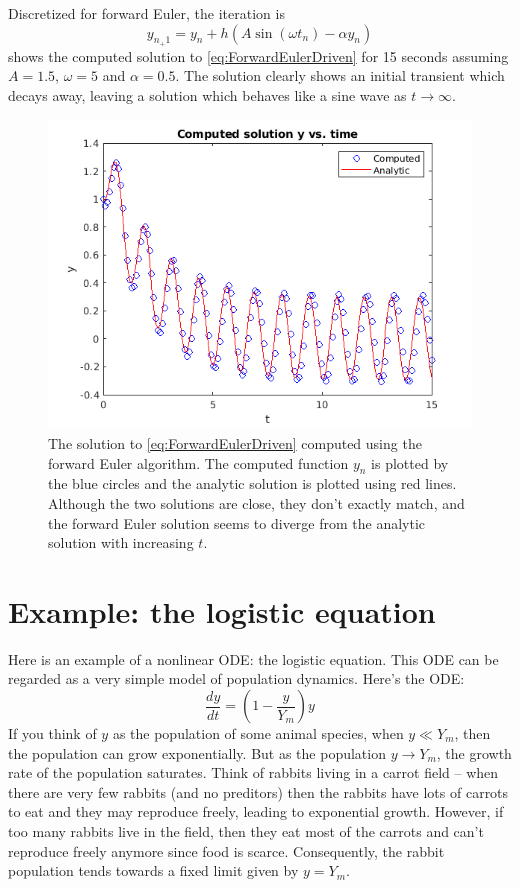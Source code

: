 \documentclass[hidelinks,notitlepage]{book}
\begin{document}
Discretized for forward Euler, the iteration is
\begin{equation}
y_{n_+1} = y_n + h(A \sin(\omega t_n) - \alpha y_n)
\end{equation}
 shows the computed solution to \cref{eq:ForwardEulerDriven} for 15 seconds assuming $A = 1.5$, $\omega = 5$ and $\alpha = 0.5$.  The solution clearly shows an initial transient which decays away, leaving a solution which behaves like a sine wave as $t \rightarrow \infty$.
\begin{figure}[tbh]
	\centering
	\includegraphics[width=0.7\columnwidth]{ForwardEulerDriven.png}
	\caption{The solution to \cref{eq:ForwardEulerDriven} computed using the forward Euler algorithm.  The computed function $y_n$ is plotted by the blue circles and the analytic solution is plotted using red lines.  Although the two solutions are close, they don't exactly match, and the forward Euler solution seems to diverge from the analytic solution with increasing $t$.}
	\label{fig:ForwardEulerDriven1}
\end{figure}

\section{Example: the logistic equation}
Here is an example of a nonlinear ODE: the logistic equation.  This ODE can be regarded as a very simple model of population dynamics.  Here's the ODE:
\begin{equation}
\label{eq:ForwardEulerLogistic}
\frac{d y}{d t} = \left( 1 - \frac{y}{Y_m} \right) y
\end{equation}
If you think of $y$ as the population of some animal species, when $y \ll Y_m$, then the population can grow exponentially.  But as the population $y \rightarrow Y_m$, the growth rate of the population saturates.  Think of rabbits living in a carrot field -- when there are very few rabbits (and no preditors) then the rabbits have lots of carrots to eat and they may reproduce freely, leading to exponential growth.  However, if too many rabbits live in the field, then they eat most of the carrots and can't reproduce freely anymore since food is scarce.  Consequently, the rabbit population tends towards a fixed limit given by $y = Y_m$.
\end{document}
